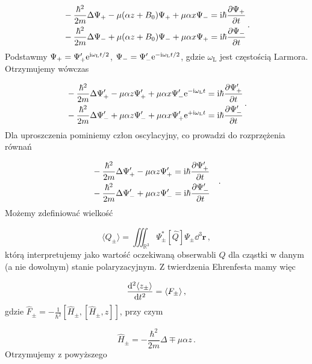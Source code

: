 \documentclass{myclass}
\begin{document}
\begin{equation*}
\begin{split}
    & -\frac{\hbar^2}{2m}\Delta\Psi_+-\mu(\alpha z+B_0)\Psi_++\mu\alpha x\Psi_-=\mathrm{i}\hbar\pdv{\Psi_+}{t}\\
    & -\frac{\hbar^2}{2m}\Delta\Psi_-+\mu(\alpha z+B_0)\Psi_-+\mu\alpha x\Psi_+=\mathrm{i}\hbar\pdv{\Psi_-}{t}
\end{split}\,.
\end{equation*}
Podstawmy \(\Psi_+=\Psi_+'\mathrm{e}^{\mathrm{i}\omega_\text{L}t/2}\),
\(\Psi_-=\Psi_-'\mathrm{e}^{-\mathrm{i}\omega_\text{L}t/2}\), gdzie \(\omega_\text{L}\) jest częstością Larmora.
Otrzymujemy wówczas

\begin{equation*}
\begin{split}
    &-\frac{\hbar^2}{2m}\Delta\Psi_+'-\mu\alpha z\Psi_+'+\mu\alpha x\Psi_-'\mathrm{e}^{-\mathrm{i}\omega_\text{L}t}=\mathrm{i}\hbar\pdv{\Psi_+'}{t}\\
    &-\frac{\hbar^2}{2m}\Delta\Psi_-'+\mu\alpha z\Psi_-'+\mu\alpha x\Psi_+'\mathrm{e}^{+\mathrm{i}\omega_\text{L}t}=\mathrm{i}\hbar\pdv{\Psi_-'}{t}
\end{split}\,.
\end{equation*}
Dla uproszczenia pominiemy człon oscylacyjny, co prowadzi do rozprzężenia równań

\begin{equation*}
\begin{split}
    &-\frac{\hbar^2}{2m}\Delta\Psi_+'-\mu\alpha z\Psi_+'=\mathrm{i}\hbar\pdv{\Psi_+'}{t}\\
    &-\frac{\hbar^2}{2m}\Delta\Psi_-'+\mu\alpha z\Psi_-'=\mathrm{i}\hbar\pdv{\Psi_-'}{t}
\end{split}\quad.
\end{equation*}
Możemy zdefiniować wielkość

\begin{equation*}
\langle Q_\pm\rangle=\iiint_{\mathbb{R}^3}\Psi_\pm^*[\hat{Q}]\Psi_\pm\dd{^3\mathbf{r}}\,,
\end{equation*}
którą interpretujemy jako wartość oczekiwaną obserwabli \(Q\) dla cząstki w danym (a nie dowolnym)
stanie polaryzacyjnym. Z twierdzenia Ehrenfesta mamy więc

\begin{equation*}
\dv[2]{\langle z_\pm\rangle}{t}=\langle F_\pm\rangle\,,
\end{equation*}
gdzie \(\hat{F}_\pm=-\frac{1}{\hbar^2}\left[\hat{H}_\pm,[\hat{H}_\pm,z]\right]\), przy czym

\begin{equation*}
\hat{H}_\pm=-\frac{\hbar^2}{2m}\Delta\mp\mu\alpha z\,.
\end{equation*}
Otrzymujemy z powyższego
\end{document}
